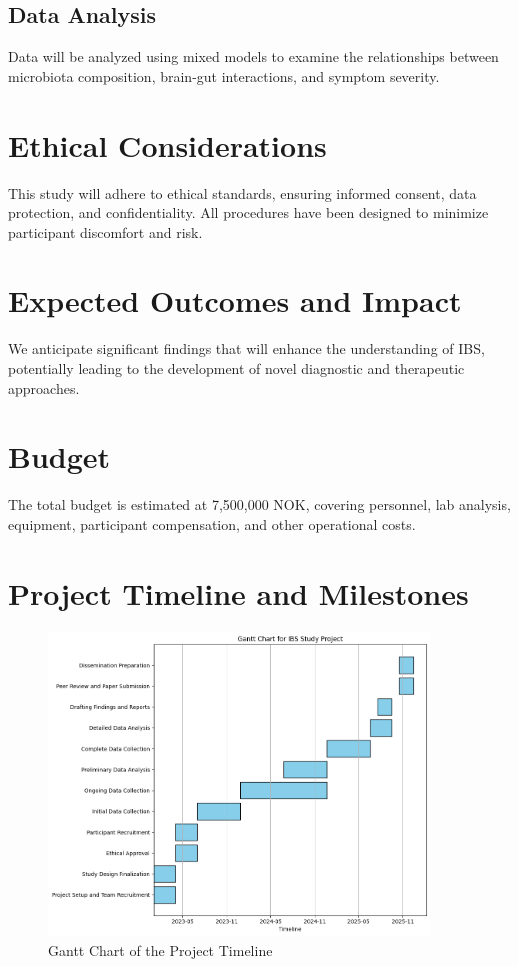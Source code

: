 \documentclass[11pt,a4paper]{article}
\begin{document}
\subsection{Data Analysis}
Data will be analyzed using mixed models to examine the relationships between microbiota composition, brain-gut interactions, and symptom severity.

\section{Ethical Considerations}
This study will adhere to ethical standards, ensuring informed consent, data protection, and confidentiality. All procedures have been designed to minimize participant discomfort and risk.

\section{Expected Outcomes and Impact}
We anticipate significant findings that will enhance the understanding of IBS, potentially leading to the development of novel diagnostic and therapeutic approaches.

\section{Budget}
The total budget is estimated at 7,500,000 NOK, covering personnel, lab analysis, equipment, participant compensation, and other operational costs.

\section{Project Timeline and Milestones}
\begin{figure}[h]
\centering
\includegraphics[width=0.9\textwidth]{./assets/gantt-chart-ibs.png}
\caption{Gantt Chart of the Project Timeline}
\end{figure}
\end{document}
